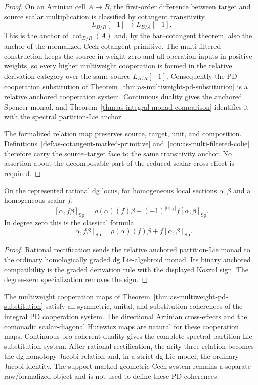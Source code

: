 \begin{proof}
On an Artinian cell $A\to B$, the first-order difference between target and
source scalar multiplication is classified by cotangent transitivity
\[
    L_{B/R}[-1]
    \longrightarrow
    L_{B/A}[-1].
\]
This is the anchor of $\operatorname{cot}_{B/R}(A)$ and, by the
bar--cotangent theorem, also the anchor of the normalized Cech cotangent
primitive.  The multi-filtered construction keeps the source in weight zero
and all operation inputs in positive weights, so every higher multiweight
cooperation is formed in the relative derivation category over the same
source $L_{B/R}[-1]$.  Consequently the PD cooperation substitution of
Theorem~\ref{thm:as-multiweight-pd-substitution} is a relative anchored
cooperation system.  Continuous duality gives the anchored Spencer monad,
and Theorem~\ref{thm:as-integral-monad-comparison} identifies it with the
spectral partition-Lie anchor.

The formalized relation map preserves source, target, unit, and composition.
Definitions~\ref{def:as-cotangent-marked-primitive} and~\ref{con:as-multi-filtered-colie} therefore carry the source--target face to
the same transitivity anchor.  No assertion about the decomposable part of
the reduced scalar cross-effect is required.
\end{proof}

\begin{corollary}
\label{cor:as-spencer-leibniz}
On the represented rational dg locus, for homogeneous local sections
$\alpha,\beta$ and a homogeneous scalar $f$,
\[
\boxed{
    [\alpha,f\beta]_{\mathrm{Sp}}
    =
    \rho(\alpha)(f)\beta
    +
    (-1)^{|\alpha||f|}
    f[\alpha,\beta]_{\mathrm{Sp}}.
}
\]
In degree zero this is the classical formula
\[
    [\alpha,f\beta]_{\mathrm{Sp}}
    =
    \rho(\alpha)(f)\beta
    +
    f[\alpha,\beta]_{\mathrm{Sp}}.
\]
\end{corollary}

\begin{proof}
Rational rectification sends the relative anchored partition-Lie monad to the
ordinary homologically graded dg Lie-algebroid monad.  Its binary anchored
compatibility is the graded derivation rule with the displayed Koszul sign.
The degree-zero specialization removes the sign.
\end{proof}

\begin{theorem}
\label{thm:as-higher-coherence}
The multiweight cooperation maps of
Theorem~\ref{thm:as-multiweight-pd-substitution} satisfy all symmetric,
unital, and substitution coherences of the integral PD cooperation system.
The directional Artinian cross-effects and the comonadic scalar-diagonal
Hurewicz maps are natural for these cooperation maps.  Continuous
pro-coherent duality gives the complete spectral partition-Lie substitution
system.  After rational rectification, the arity-three relation becomes the
dg homotopy-Jacobi relation and, in a strict dg Lie model, the ordinary Jacobi
identity.  The support-marked geometric Cech system remains a separate
raw/formalized object and is not used to define these PD coherences.
\end{theorem}

